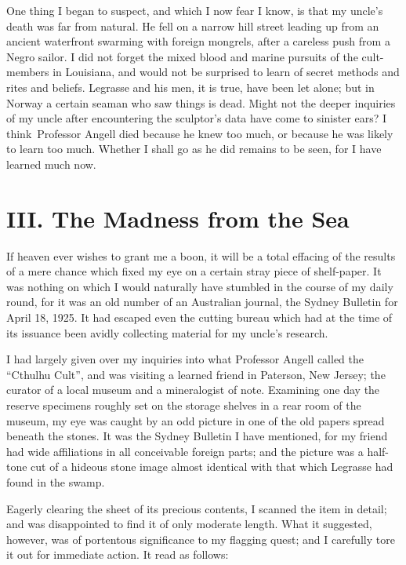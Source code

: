 One thing I began to suspect, and which I now fear I know, is that my
uncle's death was far from natural. He fell on a narrow hill street
leading up from an ancient waterfront swarming with foreign mongrels,
after a careless push from a Negro sailor. I did not forget the mixed
blood and marine pursuits of the cult-members in Louisiana, and would
not be surprised to learn of secret methods and rites and beliefs.
Legrasse and his men, it is true, have been let alone; but in Norway a
certain seaman who saw things is dead. Might not the deeper inquiries of
my uncle after encountering the sculptor's data have come to sinister
ears? I think\est\ Professor Angell died because he knew too much, or because
he was likely to learn too much. Whether I shall go as he did remains to
be seen, for I have learned much now.


\chapter*{III. The Madness from the Sea}

If heaven ever wishes to grant me a boon, it will be a total effacing of
the results of a mere chance which fixed my eye on a certain stray piece
of shelf-paper. It was nothing on which I would naturally have stumbled
in the course of my daily round, for it was an old number of an
Australian journal, the Sydney Bulletin for April 18, 1925. It had
escaped even the cutting bureau which had at the time of its issuance
been avidly collecting material for my uncle's research.

I had largely given over my inquiries into what Professor Angell called
the ``Cthulhu Cult'', and was visiting a learned friend in Paterson, New
Jersey; the curator of a local museum and a mineralogist of note.
Examining one day the reserve specimens roughly set on the storage
shelves in a rear room of the museum, my eye was caught by an odd
picture in one of the old papers spread beneath the stones. It was the
Sydney Bulletin I have mentioned, for my friend had wide affiliations in
all conceivable foreign parts; and the picture was a half-tone cut of a
hideous stone image almost identical with that which Legrasse had found
in the swamp.

Eagerly clearing the sheet of its precious contents, I scanned the item
in detail; and was disappointed to find it of only moderate length. What
it suggested, however, was of portentous significance to my flagging
quest; and I carefully tore it out for immediate action. It read as
follows:

